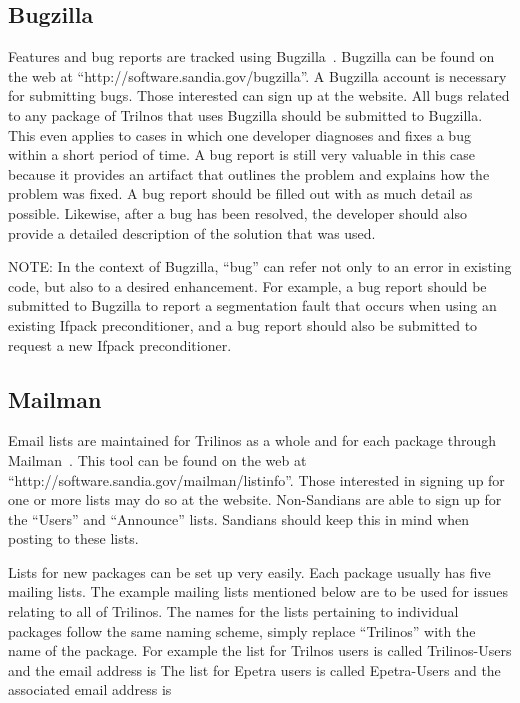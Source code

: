 \documentclass[12pt,relax]{TrilinosDevGuide}
\begin{document}
\subsection{Bugzilla}
\label{subsect:Bugzilla}
Features and bug reports are tracked using Bugzilla~\cite{Bugzilla}.  Bugzilla 
can be found on the web at ``http://software.sandia.gov/bugzilla''.  A 
Bugzilla account is necessary for submitting bugs.  Those interested can sign 
up at the website.  All bugs related to any package of Trilnos that uses 
Bugzilla should be submitted to Bugzilla.  This even applies to cases in which 
one developer diagnoses and fixes a bug within a short period of time.  A bug 
report is still very valuable in this case because it provides an artifact 
that outlines the problem and explains how the problem was fixed.  A bug 
report should be filled out with as much detail as possible.  Likewise, after 
a bug has been resolved, the developer should also provide a detailed 
description of the solution that was used.

NOTE: In the context of Bugzilla, ``bug'' can refer not only to an error in 
existing code, but also to a desired enhancement.  For example, a bug report 
should be submitted to Bugzilla to report a segmentation fault that occurs 
when using an existing Ifpack preconditioner, and a bug report should also be
submitted to request a new Ifpack preconditioner.

\subsection{Mailman}

Email lists are maintained for Trilinos as a whole and for each package 
through Mailman~\cite{Mailman}.  This tool can be found on the web at 
``http://software.sandia.gov/mailman/listinfo''.  Those interested in signing 
up for one or more lists may do so at the website.  Non-Sandians are able to 
sign up for the ``Users'' and ``Announce'' lists.  Sandians should keep this 
in mind when posting to these lists.

Lists for new packages can be set up very easily.  Each package usually has 
five mailing lists.  The example mailing lists mentioned below are to be used 
for issues relating to all of Trilinos.  The names for the lists pertaining to 
individual packages follow the same naming scheme, simply replace ``Trilinos'' 
with the name of the package.  For example the list for Trilnos users is 
called Trilinos-Users and the email address is 
  The list 
for Epetra users is called Epetra-Users and the associated email address is 
\end{document}
